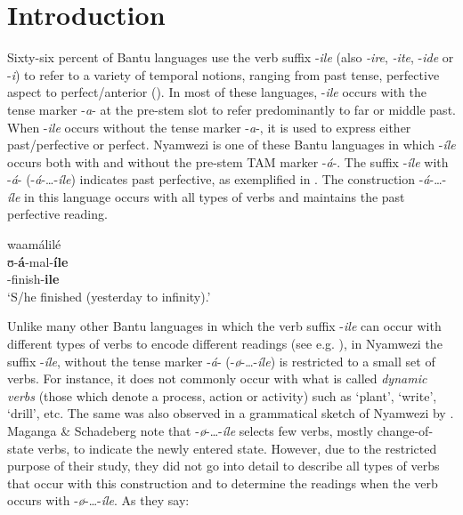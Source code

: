 \documentclass[output=paper,newtxmath,modfonts,nonflat,draftmode]{langsci/langscibook}
\author{Ponsiano Sawaka Kanijo\affiliation{University of Gothenburg}}
\title{}
\begin{document}
\maketitle


\section{Introduction}

Sixty-six percent of Bantu languages use the verb suffix -\textit{ile} (also \textit{-ire}, \textit{-ite}, -\textit{ide} or -\textit{i}) to refer to a variety of temporal notions, ranging from past tense, perfective aspect to perfect/anterior (\citealt{Nurse2008,Botne2010}). In most of these languages, -\textit{ile} occurs with the tense marker -\textit{a}- at the pre-stem slot to refer predominantly to far or middle past. When -\textit{ile} occurs without the tense marker -\textit{a}-, it is used to express either past/perfective or perfect. Nyamwezi is one of these Bantu languages in which -\textit{íle} occurs both with and without the pre-stem TAM marker -\textit{á}-. The suffix -\textit{íle} with -\textit{á}- (-\textit{á}-…-\textit{íle}) indicates past perfective, as exemplified in . The construction -\textit{á}-…-\textit{íle} in this language occurs with all types of verbs and maintains the past perfective reading. 

\ea \label{ex:kanijo:1}
\glll waamálilé\\
ʊ-\textbf{á}-mal-\textbf{íle}\\
-finish-\textbf{ile}\\
\glt ‘S/he finished (yesterday to infinity).’\\
\z

Unlike many other Bantu languages in which the verb suffix -\textit{ile} can occur with different types of verbs to encode different readings (see e.g. \citealt{Brisard2009}), in Nyamwezi the suffix -\textit{íle}, without the tense marker -\textit{á}- (-\textit{ø}-…-\textit{íle}) is restricted to a small set of verbs. For instance, it does not commonly occur with what is called \textit{dynamic} \textit{verbs} (those which denote a process, action or activity) such as ‘plant’, ‘write’, ‘drill’, etc. The same was also observed in a grammatical sketch of Nyamwezi by \citet{Maganga1992}. Maganga \& Schadeberg note that -\textit{ø}-…-\textit{íle} selects few verbs, mostly change-of-state verbs, to indicate the newly entered state. However, due to the restricted purpose of their study, they did not go into detail to describe all types of verbs that occur with this construction and to determine the readings when the verb occurs with -\textit{ø}-…-\textit{íle}. As they say:
\end{document}

